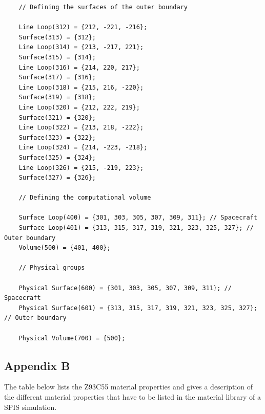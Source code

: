 \documentclass[a4paper, 12pt]{article}
\begin{document}
\begin{verbatim}
    // Defining the surfaces of the outer boundary

    Line Loop(312) = {212, -221, -216};
    Surface(313) = {312};
    Line Loop(314) = {213, -217, 221};
    Surface(315) = {314};
    Line Loop(316) = {214, 220, 217};
    Surface(317) = {316};
    Line Loop(318) = {215, 216, -220};
    Surface(319) = {318};
    Line Loop(320) = {212, 222, 219};
    Surface(321) = {320};
    Line Loop(322) = {213, 218, -222};
    Surface(323) = {322};
    Line Loop(324) = {214, -223, -218};
    Surface(325) = {324};
    Line Loop(326) = {215, -219, 223};
    Surface(327) = {326};

    // Defining the computational volume

    Surface Loop(400) = {301, 303, 305, 307, 309, 311}; // Spacecraft
    Surface Loop(401) = {313, 315, 317, 319, 321, 323, 325, 327}; // Outer boundary
    Volume(500) = {401, 400};

    // Physical groups

    Physical Surface(600) = {301, 303, 305, 307, 309, 311}; // Spacecraft
    Physical Surface(601) = {313, 315, 317, 319, 321, 323, 325, 327}; // Outer boundary

    Physical Volume(700) = {500};

\end{verbatim}

\subsection{Appendix B}

The table below lists the Z93C55 material properties and gives a description of the different material properties that have to be listed in the material library of a SPIS simulation.

\bgroup
\def\arraystretch{1.5}
\end{document}
